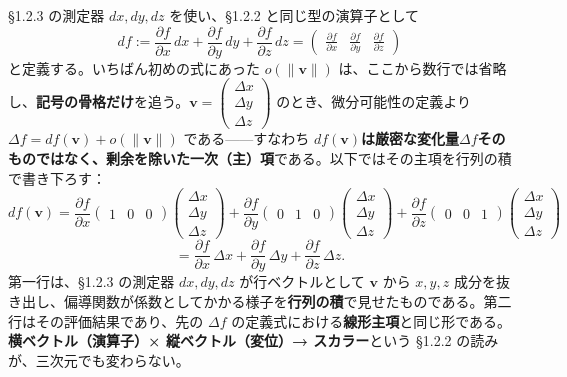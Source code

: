 \documentclass[a4paper,12pt,openany]{book}
\begin{document}
§1.2.3 の測定器 \(dx,dy,dz\) を使い、§1.2.2 と同じ型の演算子として
\[df := \frac{\partial f}{\partial x}\,dx + \frac{\partial f}{\partial y}\,dy + \frac{\partial f}{\partial z}\,dz = \begin{pmatrix} \frac{\partial f}{\partial x} & \frac{\partial f}{\partial y} & \frac{\partial f}{\partial z} \end{pmatrix}\]
と定義する。いちばん初めの式にあった \(o(\|\mathbf{v}\|)\)
は、ここから数行では省略し、\textbf{記号の骨格だけ}を追う。\(\mathbf{v}=\begin{pmatrix}\Delta x\\\Delta y\\\Delta z\end{pmatrix}\)
のとき、微分可能性の定義より
\(\Delta f = df(\mathbf{v}) + o(\|\mathbf{v}\|)\) である——すなわち
\(df(\mathbf{v})\)\textbf{は厳密な変化量}\(\Delta f\)\textbf{そのものではなく、剰余を除いた一次（主）項}である。以下ではその主項を行列の積で書き下ろす：
\[df(\mathbf{v}) = \frac{\partial f}{\partial x}\begin{pmatrix}1&0&0\end{pmatrix}\begin{pmatrix}\Delta x\\\Delta y\\\Delta z\end{pmatrix} + \frac{\partial f}{\partial y}\begin{pmatrix}0&1&0\end{pmatrix}\begin{pmatrix}\Delta x\\\Delta y\\\Delta z\end{pmatrix} + \frac{\partial f}{\partial z}\begin{pmatrix}0&0&1\end{pmatrix}\begin{pmatrix}\Delta x\\\Delta y\\\Delta z\end{pmatrix}\]
\[= \frac{\partial f}{\partial x}\,\Delta x + \frac{\partial f}{\partial y}\,\Delta y + \frac{\partial f}{\partial z}\,\Delta z.\]
第一行は、§1.2.3 の測定器 \(dx,dy,dz\) が行ベクトルとして \(\mathbf{v}\)
から \(x,y,z\)
成分を抜き出し、偏導関数が係数としてかかる様子を\textbf{行列の積}で見せたものである。第二行はその評価結果であり、先の
\(\Delta f\)
の定義式における\textbf{線形主項}と同じ形である。\textbf{横ベクトル（演算子）× 縦ベクトル（変位）→ スカラー}という
§1.2.2 の読みが、三次元でも変わらない。
\end{document}
